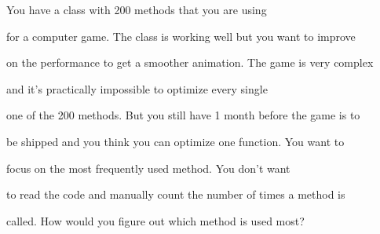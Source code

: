 You have a class with 200 methods that you are using

for a computer game. The class is working well but you want to improve

on the performance to get a smoother animation. The game is very complex

and it's practically impossible to optimize every single

one of the 200 methods. But you still have 1 month before the game is to

be shipped and you think you can optimize one function. You want to

focus on the most frequently used method. You don't want

to read the code and manually count the number of times a method is

called. How would you figure out which method is used most?


